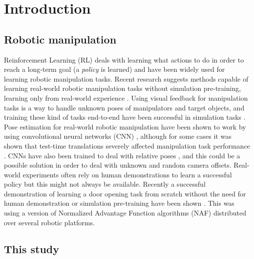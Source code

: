 \section{Introduction}

\subsection{Robotic manipulation}

Reinforcement Learning (RL) deals with learning what actions to do in order to
reach a long-term goal (a \textit{policy} is learned) and have been widely used
for learning robotic manipulation tasks. Recent research suggests methods
capable of learning real-world robotic manipulation tasks without simulation
pre-training, learning only from real-world experience
\cite{yahya2016collective,gu2016deep,finn2016deep,chebotar2016path}. Using
visual feedback for manipulation tasks is a way to handle unknown poses of
manipulators and target objects, and training these kind of tasks end-to-end
have been successful in simulation tasks
\cite{schulman2015trust,lillicrap2015continuous}. Pose estimation for
real-world robotic manipulation have been shown to work by using convolutional
neural networks (CNN)
\cite{levine2016end,chebotar2016path,yahya2016collective}, although for some
cases it was shown that test-time translations severely affected manipulation
task performance \cite{yahya2016collective}. CNNs have also been trained to
deal with relative poses \cite{park20163d}, and this could be a possible
solution in order to deal with unknown and random camera offsets. Real-world
experiments often rely on human demonstrations to learn a successful policy but
this might not always be available. Recently a successful demonstration of
learning a door opening task from scratch without the need for human
demonstration or simulation pre-training have been shown \cite{gu2016deep}.
This was using a version of Normalized Advantage Function algorithms (NAF)
\cite{gu2016continuous} distributed over several robotic platforms.

\subsection{This study}

